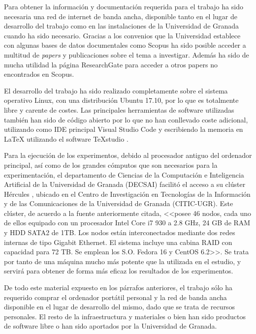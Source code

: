 Para obtener la información y documentación requerida para el trabajo ha sido necesaria una red de internet de banda ancha, disponible tanto en el lugar de desarrollo del trabajo como en las instalaciones de la Universidad de Granada cuando ha sido necesario. Gracias a los convenios que la Universidad establece con algunas bases de datos documentales como Scopus \cite{scopus-website} ha sido posible acceder a multitud de \textit{papers} y publicaciones sobre el tema a investigar. Además ha sido de mucha utilidad la página ResearchGate \cite{research-gate-website} para acceder a otros papers no encontrados en Scopus.

El desarrollo del trabajo ha sido realizado completamente sobre el sistema operativo Linux, con una distribución Ubuntu 17.10, por lo que es totalmente libre y carente de costes. Las principales herramientas de software utilizadas también han sido de código abierto por lo que no han conllevado coste adicional, utilizando como IDE principal Visual Studio Code \cite{vscode-github} y escribiendo la memoria en LaTeX utilizando el software TeXstudio \cite{texstudio}.

Para la ejecución de los experimentos, debido al procesador antiguo del ordenador principal, así como de los grandes cómputos que son necesarios para la experimentación, el departamento de Ciencias de la Computación e Inteligencia Artificial de la Universidad de Granada (DECSAI) facilitó el acceso a su clúster Hércules \cite{cluster-hercules}, ubicado en el Centro de Investigación en Tecnologías de la Información y de las Comunicaciones de la Universidad de Granada (CITIC-UGR). Este clúster, de acuerdo a la fuente anteriormente citada, <<posee 46 nodos, cada uno de ellos equipado con un procesador Intel Core i7 930 a 2.8 GHz, 24 GB de RAM y HDD SATA2 de 1TB. Los nodos están interconectados mediante dos redes internas de tipo Gigabit Ethernet. El sistema incluye una cabina RAID con capacidad para 72 TB. Se emplean los S.O. Fedora 16 y CentOS 6.2>>. Se trata por tanto de una máquina mucho más potente que la utilizada en el estudio, y servirá para obtener de forma más eficaz los resultados de los experimentos.

De todo este material expuesto en los párrafos anteriores, el trabajo sólo ha requerido comprar el ordenador portátil personal y la red de banda ancha disponible en el lugar de desarrollo del mismo, dado que se trata de recursos personales. El resto de la infraestructura y materiales o bien han sido productos de software libre o han sido aportados por la Universidad de Granada.


